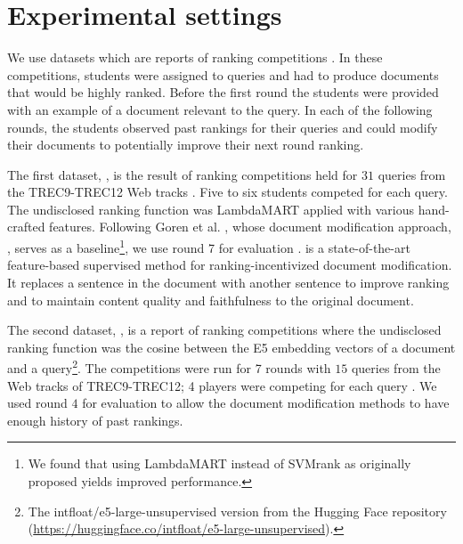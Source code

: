 \section{Experimental settings}
\label{sec:experimental-setup}
We use datasets which are reports of ranking
competitions \cite{raifer2017information,Mordo+al:25a}. In these
competitions, students were assigned to queries and had to produce
documents that would be highly ranked. Before the first round the students were provided with an example of a document relevant to the query. In each of the following rounds, the students observed past rankings for their queries and could modify their documents to potentially improve their next round ranking.

The first dataset, \firstmention{\firstDataset}, is the result of
ranking competitions held for $31$ queries from the TREC9-TREC12 Web
tracks \cite{raifer2017information}. Five to six students competed for each query. The undisclosed ranking function
was LambdaMART \cite{burges2010lambdamart} applied with various hand-crafted features. Following
Goren et al. \cite{goren2020ranking}, whose document modification
approach, \firstmention{\sentReplace}, serves as a baseline\footnote{We found that using LambdaMART instead of SVMrank as originally proposed \cite{goren2020ranking} yields improved performance.}, we use
round 7 for evaluation \cite{raifer2017information}. \sentReplace is a state-of-the-art feature-based supervised method for ranking-incentivized document modification. It
replaces a sentence in the document with another sentence to
improve ranking and to maintain content quality and faithfulness to
the original document.

The second dataset, \firstmention{\secondDataset}, is a report of
ranking competitions \cite{Mordo+al:25a} where the undisclosed ranking
function was the cosine between the E5 embedding vectors \cite{Wang+al:24a} of a document
and a query\footnote{The intfloat/e5-large-unsupervised version from
  the Hugging Face repository
  (\url{https://huggingface.co/intfloat/e5-large-unsupervised}).}. The competitions were run for 7 rounds with $15$
queries from the Web tracks of TREC9-TREC12; 4 players were competing
for each query \cite{wang2022text}.
We used round $4$ for evaluation to allow the document
modification methods to have enough history of past rankings. 

